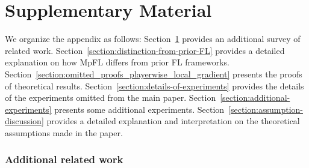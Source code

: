 \documentclass{article}
\theoremstyle{plain}
\theoremstyle{remark}
\begin{document}
\newpage

\appendix
\part*{Supplementary Material}
We organize the appendix as follows: 
Section~\ref{section:additional_related_work} provides an additional survey of related work. 
Section~\ref{section:distinction-from-prior-FL} provides a detailed explanation on how MpFL differs from prior FL frameworks.
Section~\ref{section:omitted_proofs_playerwise_local_gradient} presents the proofs of theoretical results. 
Section~\ref{section:details-of-experiments} provides the details of the experiments omitted from the main paper. 
Section~\ref{section:additional-experiments} presents some additional experiments.
Section~\ref{section:assumption-discussion} provides a detailed explanation and interpretation on the theoretical assumptions made in the paper.

\tableofcontents

\newpage

\section{Additional related work}

\label{section:additional_related_work}
\end{document}
